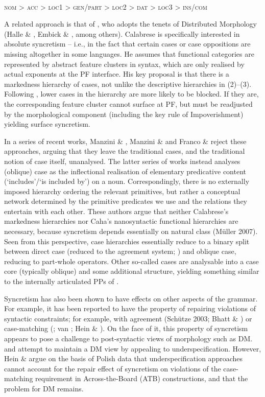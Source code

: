 \documentclass[output=paper]{langsci/langscibook}
\begin{document}
\ea%
\label{ex:intro:3}\citep[32]{Caha2009}\\
\textsc{nom > acc > loc1 > gen/part > loc2 > dat > loc3 > ins/com}
\z

A related approach is that of \citet{Calabrese2008}, who adopts the tenets of Distributed Morphology (Halle \& \citealt{Marantz1993}, Embick \& \citealt{Noyer2006}, among others). Calabrese is specifically interested in absolute syncretism – i.e., in the fact that certain cases or case oppositions are missing altogether in some languages. He assumes that functional categories are represented by abstract feature clusters in syntax, which are only realised by actual exponents at the PF interface. His key proposal is that there is a markedness hierarchy of cases, not unlike the descriptive hierarchies in (2)–(3). Following \citet{Blake2001}, lower cases in the hierarchy are more likely to be blocked. If they are, the corresponding feature cluster cannot surface at PF, but must be readjusted by the morphological component (including the key rule of Impoverishment) yielding surface syncretism.

In a series of recent works, Manzini \& \citet{Savoia2011}, Manzini \& \citet{Franco2016} and Franco \& \citet{Manzini2017} reject these approaches, arguing that they leave the traditional cases, and the traditional notion of case itself, unanalysed. The latter series of works instead analyses (oblique) case as the inflectional realisation of elementary predicative content (‘includes’/‘is included by’) on a noun. Correspondingly, there is no externally imposed hierarchy ordering the relevant primitives, but rather a conceptual network determined by the primitive predicates we use and the relations they entertain with each other. These authors argue that neither Calabrese’s markedness hierarchies nor Caha’s nanosyntactic functional hierarchies are necessary, because syncretism depends essentially on natural class (Müller 2007). Seen from this perspective, case hierarchies essentially reduce to a binary split between direct case (reduced to the agreement system; \citealt{Chomsky2001}) and oblique case, reducing to part-whole operators. Other so-called cases are analysable into a case core (typically oblique) and some additional structure, yielding something similar to the internally articulated PPs of \citet{Svenonius2006}.

Syncretism has also been shown to have effects on other aspects of the grammar. For example, it has been reported to have the property of repairing violations of syntactic constraints; for example, with agreement (Schütze 2003; Bhatt \& \citealt{Walkow2013}) or case-matching (\citealt{Citko2005}; van \citealt{Craenenbroeck2012}; Hein \& \citealt{Murphy2016}). On the face of it, this property of syncretism appears to pose a challenge to post-syntactic views of morphology such as DM. \citet{Citko2005} and \citet{Asarina2011} attempt to maintain a DM view by appealing to underspecification. However, Hein \& \citet{Murphy2016} argue on the basis of Polish data that underspecification approaches cannot account for the repair effect of syncretism on violations of the case-matching requirement in Across-the-Board (ATB) constructions, and that the problem for DM remains.
\end{document}
